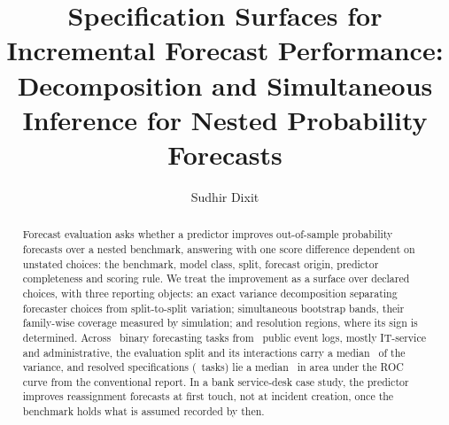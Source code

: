 

\begin{frontmatter}

\title{Specification Surfaces for Incremental Forecast Performance:
Decomposition and Simultaneous Inference for Nested Probability Forecasts}

\ifblind\else
\author[ind]{Sudhir Dixit}
\address[ind]{Independent Researcher, \affiliationStreet, \affiliationCity, \affiliationRegion, \affiliationCountry}
\fi

\begin{abstract}
Forecast evaluation asks whether a predictor improves out-of-sample
probability forecasts over a nested benchmark, answering with one score
difference dependent on unstated choices: the benchmark, model class,
split, forecast origin, predictor completeness and scoring rule. We treat
the improvement as a surface over declared choices, with three
reporting objects: an exact variance decomposition separating
forecaster choices from split-to-split variation; simultaneous bootstrap
bands, their family-wise coverage measured by simulation; and resolution
regions, where its sign is determined. Across \nPairs\ binary forecasting tasks from
\nLogs\ public event logs, mostly IT-service and
administrative, the evaluation split and its interactions carry a median
\shareResamplingStratumPct\ of the variance, and resolved specifications (\nPairsMadResolved\ tasks) lie a
median \madResolvedMedian\ in area under the ROC curve from the conventional
report. In a bank
service-desk case study, the predictor improves reassignment forecasts at
first touch, not at incident creation, once the benchmark holds what is
assumed recorded by then.
\end{abstract}


\end{frontmatter}
